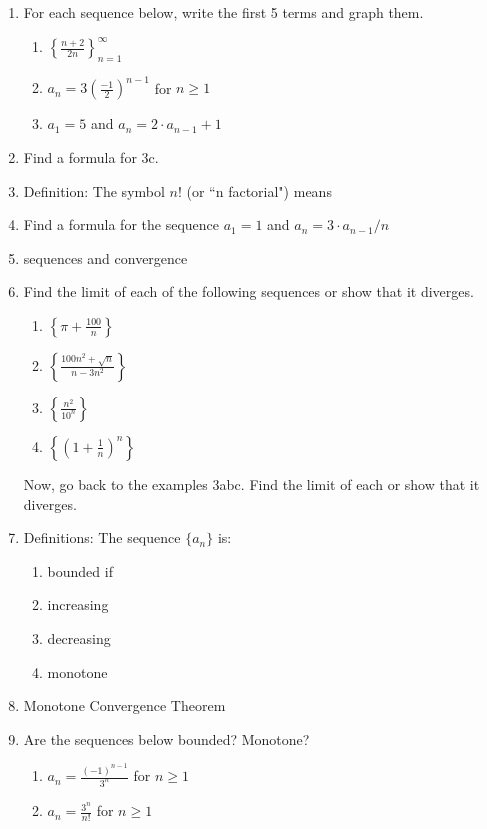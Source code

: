 \documentclass[11pt,fleqn]{article}
\begin{document}
\begin{enumerate}
\item For each sequence below, write the first 5 terms and graph them.
	\begin{enumerate}
	\item $\left\{ \frac{n+2}{2n} \right\}_{n=1}^\infty$
	\vfill
	\item $a_n=3\left(\frac{-1}{2} \right)^{n-1}$ for $n\geq 1$
	\vfill
	\item $a_1=5$ and $a_n=2\cdot a_{n-1} +1$
	\vfill
	\end{enumerate}
\newpage
\item Find a formula for 3c.
\vspace{1.5in}
\item Definition: The symbol $n!$ (or ``n factorial") means\\
\vspace{0.5in}
\item Find a formula for the sequence $a_1=1$ and $a_n=3\cdot a_{n-1}/n$
\vspace{1.7in}
\item sequences and convergence
\vfill
\newpage
\item Find the limit of each of the following sequences or show that it diverges. 
	\begin{enumerate}
	\item $\displaystyle \left\{\pi + \frac{100}{n} \right\}$
	\vfill
	\item $\displaystyle \left\{\frac{100n^2+\sqrt{n}}{n-3n^2} \right\}$
	\vfill
	\item $\displaystyle \left\{\frac{n^2}{10^n} \right\}$
	\vfill
	\item $\displaystyle \left\{\left(1+\frac{1}{n}\right)^n \right\}$
	\vspace{3in}
	\end{enumerate}
Now, go back to the examples 3abc. Find the limit of each or show that it diverges.
\newpage
\item Definitions: The sequence $\displaystyle \{ a_n \}$ is:\\
	\begin{enumerate}
	\item bounded if
	\vfill
	\item increasing 
	\vfill
	\item decreasing
	\vfill
	\item monotone
	\vfill
	\end{enumerate}
\item Monotone Convergence Theorem
\vfill
\item Are the sequences below bounded? Monotone?
\begin{enumerate}
	\item $a_n=\frac{(-1)^{n-1}}{3^n}$ for $n\geq 1$
	\vfill
	\item $a_n=\frac{3^n}{n!}$ for $n\geq 1$
	\vfill
\end{enumerate}
\end{enumerate}
\end{document}

